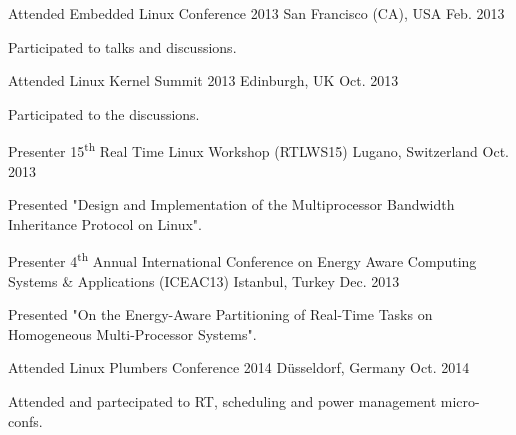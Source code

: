 \begin{cventries}
  \cventry
    {Attended} %
    {Embedded Linux Conference 2013} %
    {San Francisco (CA), USA} %
    {Feb. 2013} %
    {
      \begin{cvitems} %
        \item {Participated to talks and discussions.}
      \end{cvitems}
    }

  \cventry
    {Attended} %
    {Linux Kernel Summit 2013} %
    {Edinburgh, UK} %
    {Oct. 2013} %
    {
      \begin{cvitems} %
        \item {Participated to the discussions.}
      \end{cvitems}
    }

  \cventry
    {Presenter} %
    {15\textsuperscript{th} Real Time Linux Workshop (RTLWS15)} %
    {Lugano, Switzerland} %
    {Oct. 2013} %
    {
      \begin{cvitems} %
        \item {Presented "Design and Implementation of the Multiprocessor
		Bandwidth Inheritance Protocol on Linux".}
      \end{cvitems}
    }

  \cventry
    {Presenter} %
    {4\textsuperscript{th} Annual International Conference on Energy
    Aware Computing Systems \& Applications (ICEAC13)} %
    {Istanbul, Turkey} %
    {Dec. 2013} %
    {
      \begin{cvitems} %
        \item {Presented "On the Energy-Aware Partitioning of Real-Time Tasks
		on Homogeneous Multi-Processor Systems".}
      \end{cvitems}
    }

  \cventry
    {Attended} %
    {Linux Plumbers Conference 2014} %
    {D\"{u}sseldorf, Germany} %
    {Oct. 2014} %
    {
      \begin{cvitems} %
        \item {Attended and partecipated to RT, scheduling and power management
		micro-confs.}
      \end{cvitems}
    }


\end{cventries}
